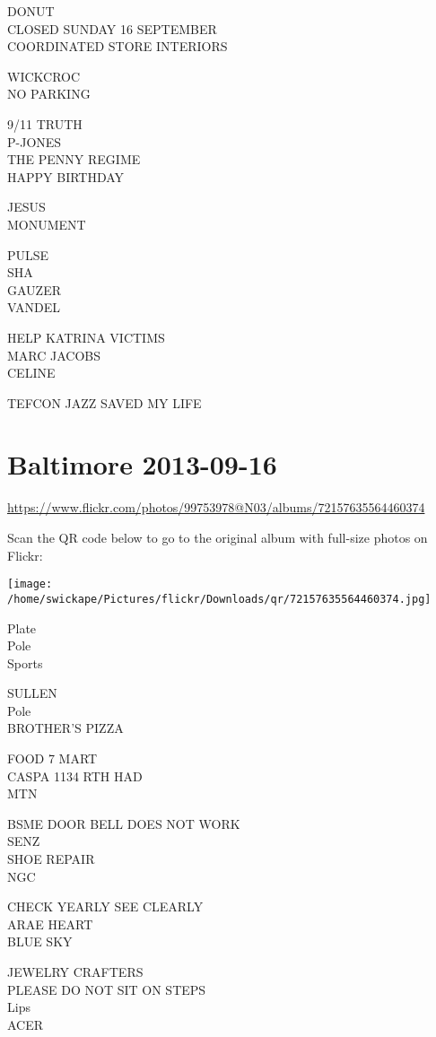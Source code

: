 \documentclass[10pt,letterpaper]{article}
\begin{document}
DONUT\\
CLOSED SUNDAY 16 SEPTEMBER\\
COORDINATED STORE INTERIORS

WICKCROC\\
NO PARKING

9/11 TRUTH\\
P{-}JONES\\
THE PENNY REGIME\\
HAPPY BIRTHDAY

JESUS\\
MONUMENT

PULSE\\
SHA\\
GAUZER\\
VANDEL

HELP KATRINA VICTIMS\\
MARC JACOBS\\
CELINE

TEFCON JAZZ SAVED MY LIFE
\pagebreak

\section*{Baltimore 2013-09-16}

\url{https://www.flickr.com/photos/99753978@N03/albums/72157635564460374}

Scan the QR code below to go to the original album with full-size photos on Flickr:

\texttt{[image: /home/swickape/Pictures/flickr/Downloads/qr/72157635564460374.jpg]}
\pagebreak

Plate\\
Pole\\
Sports

SULLEN\\
Pole\\
BROTHER'S PIZZA

FOOD 7 MART\\
CASPA 1134 RTH HAD\\
MTN

BSME DOOR BELL DOES NOT WORK\\
SENZ\\
SHOE REPAIR\\
NGC

CHECK YEARLY SEE CLEARLY\\
ARAE HEART\\
BLUE SKY

JEWELRY CRAFTERS\\
PLEASE DO NOT SIT ON STEPS\\
Lips\\
ACER
\end{document}
